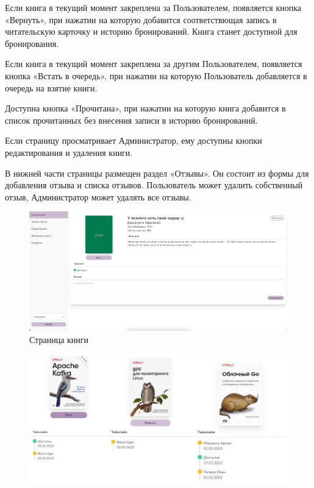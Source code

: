 \documentclass[project.tex]{subfiles}
\begin{document}
\begin{enumerate}
    \par
    Если книга в текущий момент закреплена за Пользователем, появляется кнопка «Вернуть», при нажатии на которую добавится соответствющая запись в читательскую карточку и историю бронирований. Книга станет доступной для бронирования.
    \par
    Если книга в текущий момент закреплена за другим Пользователем, появляется кнопка «Встать в очередь», при нажатии на которую Пользователь добавляется в очередь на взятие книги.
    \par
    Доступна кнопка «Прочитана», при нажатии на которую книга добавится в список прочитанных без внесения записи в историю бронирований.
    \par
    Если страницу просматривает Администратор, ему доступны кнопки редактирования и удаления книги.
    \par
    В нижней части страницы размещен раздел «Отзывы». Он состоит из формы для добавления отзыва и списка отзывов. Пользователь может удалить собственный отзыв, Администратор может удалять все отзывы.
    \begin{figure}[H]
       \label{pic:book}
       \includegraphics[width=\textwidth]{../../graphics/singlebook.png}
       \caption{Страница книги} 
    \end{figure}
    \begin{figure}[H]
       \label{pic:states}
       \includegraphics[width=\textwidth]{../../graphics/bookstates.png}

\end{figure}
\end{enumerate}
\end{document}
